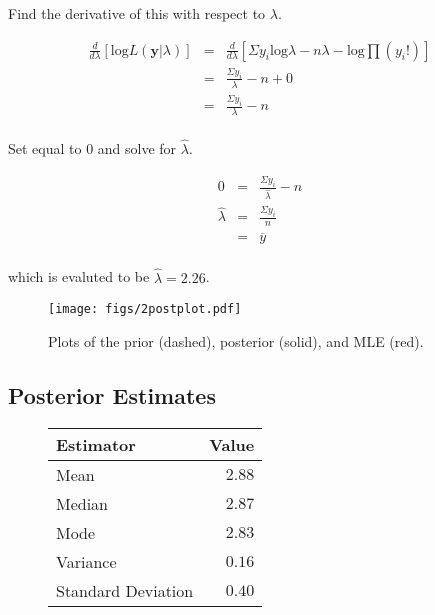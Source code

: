 \documentclass[12pt]{article}
\newcommand{\ybar}{\overline{y}}
\begin{document}
\noindent Find the derivative of this with respect to $\lambda$.

\begin{eqnarray*}
\frac{d}{d\lambda}\left[\mathrm{log}L(\mathbf{y}|\lambda)\right] &=& \frac{d}{d\lambda}\left[\Sigma y_i\mathrm{log}\lambda-n\lambda-\mathrm{log}\prod (y_i!)\right] \\
&=& \frac{\Sigma y_i}{\lambda}-n+0 \\
&=& \frac{\Sigma y_i}{\lambda}-n \\
\end{eqnarray*}

\noindent Set equal to 0 and solve for $\hat{\lambda}$.

\begin{eqnarray*}
0 &=& \frac{\Sigma y_i}{\hat{\lambda}}-n \\
\hat{\lambda} &=& \frac{\Sigma y_i}{n} \\
&=& \ybar \\
\end{eqnarray*}

\noindent which is evaluted to be $\hat{\lambda}=2.26$.

\begin{figure}[H]
\begin{center}
\texttt{[image: figs/2postplot.pdf]}
\caption{Plots of the prior (dashed), posterior (solid), and MLE (red).}
\end{center}
\end{figure}

\subsection{Posterior Estimates}

\begin{figure}[H]
\begin{center}
\begin{tabular}{l|r}
Estimator & \multicolumn{1}{l}{Value} \\ \hline \hline
Mean               & $2.88$ \\
Median             & $2.87$ \\
Mode               & $2.83$ \\
Variance           & $0.16$ \\
Standard Deviation & $0.40$ \\
\end{tabular}
\end{center}
\end{figure}
\end{document}
